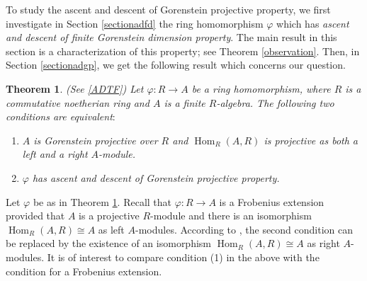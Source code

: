 \documentclass{amsart}
\newcommand{\0}{{\bf{0}}}
\DeclareMathOperator{\Hom}{Hom}
\DeclareMathOperator{\RHom}{\mathsf{RHom}}
\newtheorem{theorem}{Theorem}[section]
\newtheorem{corollary}[theorem]{Corollary}
\theoremstyle{definition}
\begin{document}

To study the ascent and descent of Gorenstein projective property, we first investigate in Section \ref{sectionadfd} the ring homomorphism $\varphi$ which has \emph{ascent and descent of finite Gorenstein dimension property}. The main result in this section is a characterization of this property; see Theorem \ref{observation}. 
Then, in Section \ref{sectionadgp}, we get the following result which concerns our question. 

\begin{theorem}\label{t2}(See \ref{ADTF})
Let $\varphi\colon R\rightarrow A$ be a ring homomorphism, where $R$ is a commutative noetherian ring and $A$ is a finite $R$-algebra.
The following two conditions are equivalent$\colon$
\begin{enumerate}
\item  $A$ is Gorenstein projective over $R$ and $\Hom_R(A,R)$ is projective as both a left and a right $A$-module.

\item $\varphi$ has ascent and descent of Gorenstein projective property.
\end{enumerate}
\end{theorem}
Let $\varphi$ be as in Theorem \ref{t2}. Recall that $\varphi\colon R\rightarrow A$ is a Frobenius extension provided that $A$ is a projective $R$-module and there is an isomorphism $\Hom_R(A,R)\cong A$ as left $A$-modules. According to \cite{Kad}, the second condition can be replaced by the existence of an isomorphism $\Hom_R(A,R)\cong A$ as right $A$-modules. It is of interest to compare condition (1) in the above with the condition for a Frobenius extension.
\end{document}
